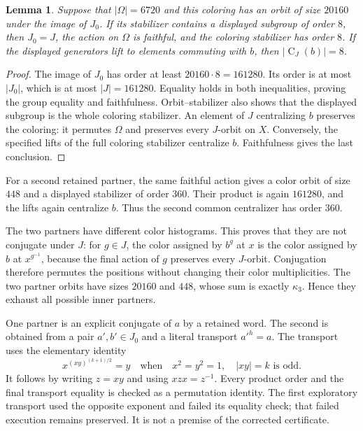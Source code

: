 \documentclass[11pt,a4paper]{article}
\newtheorem{lemma}{Lemma}
\newcommand{\C}{\operatorname{C}}
\begin{document}
\begin{lemma}\label{saturation}
Suppose that $|\Omega|=6720$ and this coloring has an orbit of size
$20160$ under the image of $J_0$. If its stabilizer contains a displayed
subgroup of order $8$, then $J_0=J$, the action on $\Omega$ is faithful,
and the coloring stabilizer has order $8$. If the displayed generators
lift to elements commuting with $b$, then $|\C_J(b)|=8$.
\end{lemma}
\begin{proof}
The image of $J_0$ has order at least $20160\cdot8=161280$.
Its order is at most $|J_0|$, which is at most $|J|=161280$.
Equality holds in both inequalities, proving the group equality and
faithfulness. Orbit--stabilizer also shows that the displayed subgroup
is the whole coloring stabilizer. An element of $J$ centralizing $b$
preserves the coloring: it permutes $\Omega$ and preserves every
$J$-orbit on $X$. Conversely, the specified lifts of the full coloring
stabilizer centralize $b$. Faithfulness gives the last conclusion.
\end{proof}

For a second retained partner, the same faithful action gives a color
orbit of size $448$ and a displayed stabilizer of order $360$. Their
product is again $161280$, and the lifts again centralize $b$. Thus
the second common centralizer has order $360$.

The two partners have different color histograms. This proves that they
are not conjugate under $J$: for $g\in J$, the color assigned by $b^g$
at $x$ is the color assigned by $b$ at $x^{g^{-1}}$, because the final
action of $g$ preserves every $J$-orbit. Conjugation therefore permutes
the positions without changing their color multiplicities. The two
partner orbits have sizes $20160$ and $448$, whose sum is exactly
$\kappa_3$. Hence they exhaust all possible inner partners.

One partner is an explicit conjugate of $a$ by a retained word. The
second is obtained from a pair $a',b'\in J_0$ and a literal transport
$a'^h=a$. The transport uses the elementary identity
\[
 x^{(xy)^{(k+1)/2}}=y
 \quad\text{when}\quad x^2=y^2=1,\quad |xy|=k\text{ is odd}.
\]
It follows by writing $z=xy$ and using $xzx=z^{-1}$.
Every product order and the final transport equality is checked as a
permutation identity. The first exploratory transport used the opposite
exponent and failed its equality check; that failed execution remains
preserved. It is not a premise of the corrected certificate.
\end{document}
